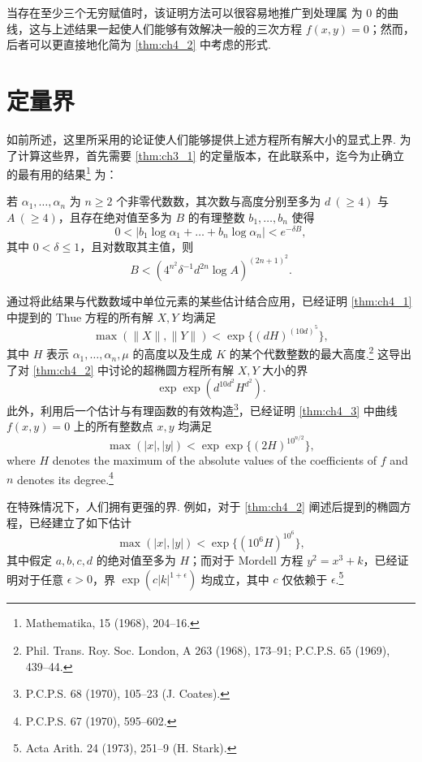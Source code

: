 当存在至少三个无穷赋值时，该证明方法可以很容易地推广到处理属 为 0 的曲线，这与上述结果一起使人们能够有效解决一般的三次方程 $f(x, y) = 0$；然而，后者可以更直接地化简为 \autoref{thm:ch4_2} 中考虑的形式.

\section{定量界}\label{sec:ch4_5}

如前所述，这里所采用的论证使人们能够提供上述方程所有解大小的显式上界. 为了计算这些界，首先需要 \autoref{thm:ch3_1} 的定量版本，在此联系中，迄今为止确立的最有用的结果\footnote{Mathematika, 15 (1968), 204--16.} 为：

若 $\alpha_1, \dots, \alpha_n$ 为 $n \ge 2$ 个非零代数数，其次数与高度分别至多为 $d \ (\ge 4)$ 与 $A \ (\ge 4)$，且存在绝对值至多为 $B$ 的有理整数 $b_1, \dots, b_n$ 使得
\[
0 < |b_1 \log \alpha_1 + \dots + b_n \log \alpha_n| < e^{-\delta B},
\]
其中 $0 < \delta \le 1$，且对数取其主值，则
\[
B < (4^{n^2} \delta^{-1} d^{2n} \log A)^{(2n+1)^2}.
\]

通过将此结果与代数数域中单位元素的某些估计结合应用，已经证明 \autoref{thm:ch4_1} 中提到的 Thue 方程的所有解 $X, Y$ 均满足
\[
\max(\|X\|, \|Y\|) < \exp\{(dH)^{(10d)^5}\},
\]
其中 $H$ 表示 $\alpha_1, \dots, \alpha_n, \mu$ 的高度以及生成 $K$ 的某个代数整数的最大高度.\footnote{Phil. Trans. Roy. Soc. London, A 263 (1968), 173--91; P.C.P.S. 65 (1969), 439--44.} 这导出了对 \autoref{thm:ch4_2} 中讨论的超椭圆方程所有解 $X, Y$ 大小的界
\[
\exp \exp \left(d^{10d^2}H^{d^2}\right).
\]
此外，利用后一个估计与有理函数的有效构造\footnote{P.C.P.S. 68 (1970), 105--23 (J. Coates). }，已经证明 \autoref{thm:ch4_3} 中曲线 $f(x,y) = 0$ 上的所有整数点 $x, y$ 均满足
\[
\max(|x|,|y|) < \exp\exp\{(2H)^{10^{n/2}}\},
\]
where $H$ denotes the maximum of the absolute values of the coefficients of $f$ and $n$ denotes its degree.\footnote{P.C.P.S. 67 (1970), 595--602.}

在特殊情况下，人们拥有更强的界. 例如，对于 \autoref{thm:ch4_2} 阐述后提到的椭圆方程，已经建立了如下估计
\[
\max (|x|, |y|) < \exp \{(10^6 H)^{10^6}\},
\]
其中假定 $a, b, c, d$ 的绝对值至多为 $H$；而对于 Mordell 方程 $y^2 = x^3 + k$，已经证明对于任意 $\epsilon > 0$，界 $\exp(c|k|^{1+\epsilon})$ 均成立，其中 $c$ 仅依赖于 $\epsilon$.\footnote{Acta Arith. 24 (1973), 251--9 (H. Stark).}

